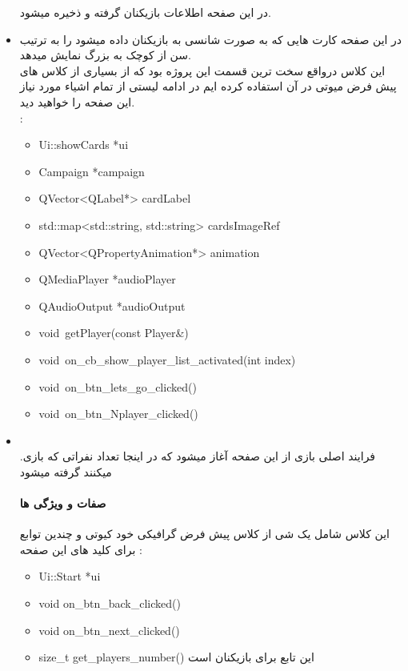 \documentclass[pdf,titlepage,a4paper]{report}
\begin{document}
\begin{itemize}
\begin{latin}
			در این صفحه اطلاعات بازیکنان گرفته و ذخیره میشود.
		\end{latin}

		\item {}  در این صفحه کارت هایی که به صورت شانسی به بازیکنان داده میشود را به ترتیب سن از کوچک به بزرگ نمایش میدهد.\\
		 این کلاس درواقع سخت ترین قسمت این پروژه بود که از بسیاری از کلاس های پیش فرض میوتی در آن استفاده کرده ایم  در ادامه لیستی از تمام اشیاء مورد نیاز این صفحه را خواهید دید.\\ :
		\begin{latin}
			\begin{itemize}
				\item Ui::showCards *ui
				\item Campaign *campaign
				\item QVector<QLabel*> cardLabel
				\item std::map<std::string, std::string> cardsImageRef
				\item QVector<QPropertyAnimation*> animation
				\item QMediaPlayer *audioPlayer
				\item QAudioOutput *audioOutput
				\item void\ getPlayer(const Player&)
				\item void\ on_cb_show_player_list_activated(int index)
				\item void\ on_btn_lets_go_clicked()
				\item void\ on_btn_Nplayer_clicked()

			\end{itemize}
		\end{latin}

		\item {} \\.فرایند اصلی بازی از این صفحه آغاز میشود که در اینجا تعداد نفراتی که بازی میکنند گرفته میشود
		\paragraph{صفات و ویژگی ها} 
         این کلاس شامل یک شی از کلاس پیش فرض گرافیکی خود کیوتی و چندین توابع برای کلید های این صفحه :
		\begin{latin}
			\begin{itemize}
				\item Ui::Start *ui
				\item void on_btn_back_clicked()
				\item void on_btn_next_clicked()
				\item size_t get_players_number()  این تابع برای بازیکنان است
			\end{itemize}
		\end{latin}


\end{itemize}
\end{document}
